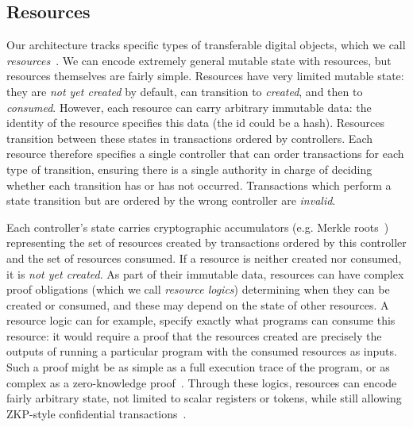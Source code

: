 \documentclass[a4paper,USenglish,cleveref, autoref, thm-restate, anonymous]{lipics-v2021}
\begin{document}
\subsection{Resources}
Our architecture tracks specific types of transferable digital objects, which we call \emph{resources}~\cite{resource}.
We can encode extremely general mutable state with resources, but resources themselves are fairly simple.
Resources have very limited mutable state: they are \emph{not yet created} by default, can transition to \emph{created}, and then to \emph{consumed}.
However, each resource can carry arbitrary immutable data: the identity of the resource specifies this data (the id could be a hash).
Resources transition between these states in transactions ordered by controllers.
Each resource therefore specifies a single controller that can order transactions for each type of transition, ensuring there is a single authority in charge of deciding whether each transition has or has not occurred.
Transactions which perform a state transition but are ordered by the wrong controller are \emph{invalid}.

Each controller's state carries cryptographic accumulators (e.g. Merkle roots~\cite{citation-needed}) representing the set of resources created by transactions ordered by this controller and the set of resources consumed.
If a resource is neither created nor consumed, it is \emph{not yet created}.
As part of their immutable data, resources can have complex proof obligations (which we call \emph{resource logics}) determining when they can be created or consumed, and these may depend on the state of other resources. %
A resource logic can for example, specify exactly what programs can consume this resource: it would require a proof that the resources created are precisely the outputs of running a particular program with the consumed resources as inputs.
Such a proof might be as simple as a full execution trace of the program, or as complex as a zero-knowledge proof~\cite{citation-needed}.
Through these logics, resources can encode fairly arbitrary state, not limited to scalar registers or tokens, while still allowing ZKP-style confidential transactions~\cite{resource}.
\end{document}
